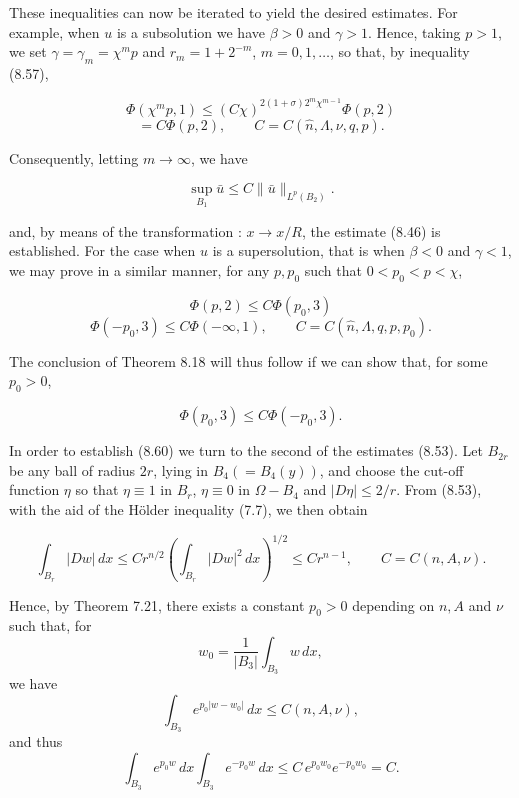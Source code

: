These inequalities can now be iterated to yield the desired estimates. For example,
when $u$ is a subsolution we have $\beta>0$ and $\gamma>1$. Hence, taking $p>1$, we set $\gamma=
\gamma_m=\chi^m p$ and $r_m=1+2^{-m}$, $m=0,1,\dots$, so that, by inequality (8.57),

\[
\Phi(\chi^m p,1)\le (C\chi)^{2(1+\sigma)2^m\chi^{m-1}}\Phi(p,2)
\]
\[
=C\Phi(p,2), \qquad C=C(\hat n,\Lambda,\nu,q,p).
\]

Consequently, letting $m\to\infty$, we have

\begin{equation}\tag{8.58}
\sup_{B_1}\bar u\le C\|\bar u\|_{L^p(B_2)}.
\end{equation}

and, by means of the transformation : $x\to x/R$, the estimate (8.46) is established.
For the case when $u$ is a supersolution, that is when $\beta<0$ and $\gamma<1$, we may prove
in a similar manner, for any $p,p_0$ such that $0<p_0<p<\chi$,

\begin{equation}\tag{8.59}
\Phi(p,2)\le C\Phi(p_0,3)
\end{equation}
\[
\Phi(-p_0,3)\le C\Phi(-\infty,1), \qquad C=C(\hat n,\Lambda,q,p,p_0).
\]

The conclusion of Theorem 8.18 will thus follow if we can show that, for some
$p_0>0$,

\begin{equation}\tag{8.60}
\Phi(p_0,3)\le C\Phi(-p_0,3).
\end{equation}



\pagestyle{empty}


In order to establish (8.60) we turn to the second of the estimates (8.53). Let
$B_{2r}$ be any ball of radius $2r$, lying in $B_4 (= B_4(y))$, and choose the cut-off function
$\eta$ so that $\eta \equiv 1$ in $B_r$, $\eta \equiv 0$ in $\Omega - B_4$ and $|D\eta| \le 2/r$. From (8.53), with the aid of
the H\"older inequality (7.7), we then obtain

\[
\int_{B_r} |Dw|\,dx \le Cr^{n/2}\left(\int_{B_r} |Dw|^2\,dx\right)^{1/2}
\le Cr^{n-1}, \qquad C = C(n, A, \nu).
\tag{8.61}
\]

Hence, by Theorem 7.21, there exists a constant $p_0 > 0$ depending on $n, A$ and $\nu$ such
that, for
\[
w_0 = \frac{1}{|B_3|}\int_{B_3} w\,dx,
\]
we have
\[
\int_{B_3} e^{p_0|w-w_0|}\,dx \le C(n, A, \nu),
\]
and thus
\[
\int_{B_3} e^{p_0w}\,dx \int_{B_3} e^{-p_0w}\,dx \le C\, e^{p_0w_0}e^{-p_0w_0} = C.
\]

